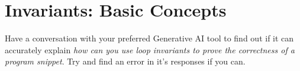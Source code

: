 \documentclass[twoside=false,DIV=14]{scrartcl}
\begin{document}






   
 

\section{Invariants: Basic Concepts}
Have a conversation with your preferred Generative AI tool to find out if it can accurately explain \emph{how can you use loop invariants to prove the correctness of a program snippet}.  Try and find an error in it's responses if you can.
\end{document}
